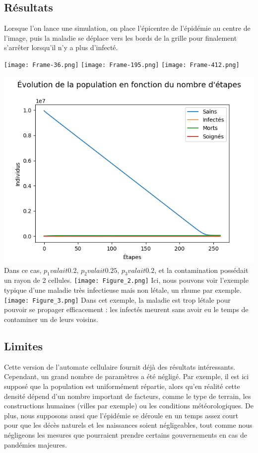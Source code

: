 \documentclass{article}
\begin{document}
\subsection{Résultats}

Lorsque l'on lance une simulation, on place l'épicentre de l'épidémie au centre de l'image, puis la maladie se déplace vers les bords de la grille pour finalement s'arrêter lorsqu'il n'y a plus d'infecté.

	\texttt{[image: Frame-36.png]}
	\texttt{[image: Frame-195.png]} 
	\texttt{[image: Frame-412.png]} 

	\begin{center}
	\includegraphics[scale=1.04]{Figure_1.png}
	Dans ce cas, $p_1 valait 0.2$, $p_2 valait 0.25$, $p_3 valait 0.2$, et la contamination possédait un rayon de 2 cellules.
	\texttt{[image: Figure\_2.png]}
	Ici, nous pouvons voir l'exemple typique d'une maladie très infectieuse mais non létale, un rhume par exemple.
	\texttt{[image: Figure\_3.png]} 
Dans cet exemple, la maladie est trop létale pour pouvoir se propager efficacement : les infectés meurent sans avoir eu le temps de contaminer un de leurs voisins.

	\end{center}
\subsection{Limites}
	Cette version de l'automate cellulaire fournit déjà des résultats intéressants. Cependant, un grand nombre de paramètres a été négligé. Par exemple, il est ici supposé que la population est uniformément répartie, alors qu'en réalité cette densité dépend d'un nombre important de facteurs, comme le type de terrain, les constructions humaines (villes par exemple) ou les conditions météorologiques. De plus, nous supposons aussi que l'épidémie se déroule en un temps assez court pour que les décès naturels et les naissances soient négligeables, tout comme nous négligeons les mesures que pourraient prendre certains gouvernements en cas de pandémies majeures.
	
\end{document}
